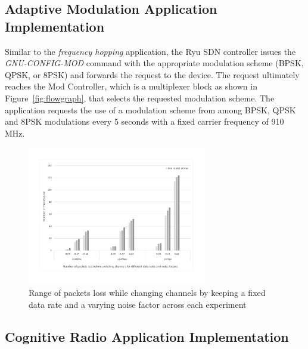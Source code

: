 \subsection{Adaptive Modulation  Application Implementation}

Similar to the \emph{frequency hopping} application, the Ryu SDN controller issues the \emph{GNU-CONFIG-MOD} command with the appropriate modulation scheme (BPSK, QPSK, or 8PSK) and forwards the request to the device. The request ultimately reaches the Mod Controller, which is a multiplexer block as shown in Figure~\ref{fig:flowgraph}, that selects the requested modulation scheme. The application requests the use of a modulation scheme from among BPSK, QPSK and 8PSK modulations every 5 seconds with a fixed carrier frequency of 910 MHz.

\begin{figure}[t]
  \centering
  \includegraphics[width=0.7\textwidth]{figures/Overhead.pdf}
  \caption{Range of packets loss while changing channels by keeping a fixed data rate and a varying noise factor across each experiment}
  \label{fig:overhead}
\end{figure}
\subsection{Cognitive Radio Application Implementation}

